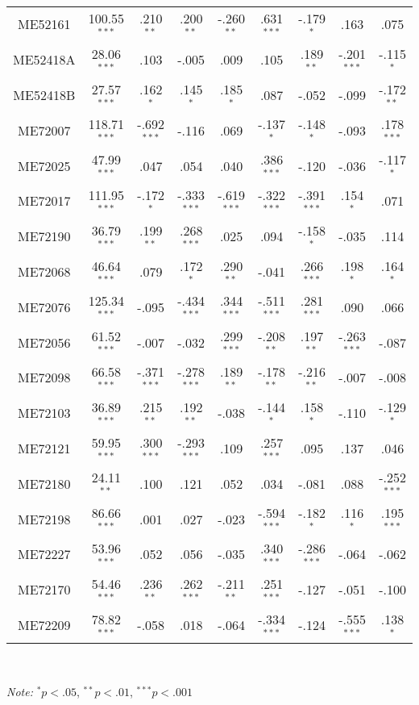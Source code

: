 \documentclass{interact}
\begin{document}
\begin{table}[p]
\begin{tabular}{c c | c c c c c c c}
      ME52161 & 100.55$^{***}$ & .210$^{**}$ & .200$^{**}$ & -.260$^{**}$ & .631$^{***}$ & -.179$^{*}$ & .163 & .075\\
      ME52418A & 28.06$^{***}$ & .103 & -.005 & .009 & .105 & .189$^{**}$ & -.201$^{***}$ & -.115$^{*}$\\
      ME52418B & 27.57$^{***}$ & .162$^{*}$ & .145$^{*}$ & .185$^{*}$ & .087 & -.052 & -.099 & -.172$^{**}$\\
      ME72007 & 118.71$^{***}$ & -.692$^{***}$ & -.116 & .069 & -.137$^{*}$ & -.148$^{*}$ & -.093 & .178$^{***}$\\
      ME72025 & 47.99$^{***}$ & .047 & .054 & .040 & .386$^{***}$ & -.120 & -.036 & -.117$^{*}$\\
      ME72017 & 111.95$^{***}$ & -.172$^{*}$ & -.333$^{***}$ & -.619$^{***}$ & -.322$^{***}$ & -.391$^{***}$ & .154$^{*}$ & .071\\
      ME72190 & 36.79$^{***}$ & .199$^{**}$ & .268$^{***}$ & .025 & .094 & -.158$^{*}$ & -.035 & .114\\
      ME72068 & 46.64$^{***}$ & .079 & .172$^{*}$ & .290$^{**}$ & -.041 & .266$^{***}$ & .198$^{*}$ & .164$^{*}$\\
      ME72076 & 125.34$^{***}$ & -.095 & -.434$^{***}$ & .344$^{***}$ & -.511$^{***}$ & .281$^{***}$ & .090 & .066\\
      ME72056 & 61.52$^{***}$ & -.007 & -.032 & .299$^{***}$ & -.208$^{**}$ & .197$^{**}$ & -.263$^{***}$ & -.087\\
      ME72098 & 66.58$^{***}$ & -.371$^{***}$ & -.278$^{***}$ & .189$^{**}$ & -.178$^{**}$ & -.216$^{**}$ & -.007 & -.008\\
      ME72103 & 36.89$^{***}$ & .215$^{**}$ & .192$^{**}$ & -.038 & -.144$^{*}$ & .158$^{*}$ & -.110 & -.129$^{*}$\\
      ME72121 & 59.95$^{***}$ & .300$^{***}$ & -.293$^{***}$ & .109 & .257$^{***}$ & .095 & .137 & .046\\
      ME72180 & 24.11$^{**}$ & .100 & .121 & .052 & .034 & -.081 & .088 & -.252$^{***}$\\
      ME72198 & 86.66$^{***}$ & .001 & .027 & -.023 & -.594$^{***}$ & -.182$^{*}$ & .116$^{*}$ & .195$^{***}$\\
      ME72227 & 53.96$^{***}$ & .052 & .056 & -.035 & .340$^{***}$ & -.286$^{***}$ & -.064 & -.062\\
      ME72170 & 54.46$^{***}$ & .236$^{**}$ & .262$^{***}$ & -.211$^{**}$ & .251$^{***}$ & -.127 & -.051 & -.100\\
      ME72209 & 78.82$^{***}$ & -.058 & .018 & -.064 & -.334$^{***}$ & -.124 & -.555$^{***}$ & .138$^{*}$\\
      \hline
    \end{tabular}\\
    \begin{flushleft}
    \footnotesize{\hspace{.3cm}\textit{Note:} $^* p<.05$, $^{**} p<.01$, $^{***} p<.001$ }\\
    \end{flushleft}
\end{table}
\restoregeometry
\end{document}
